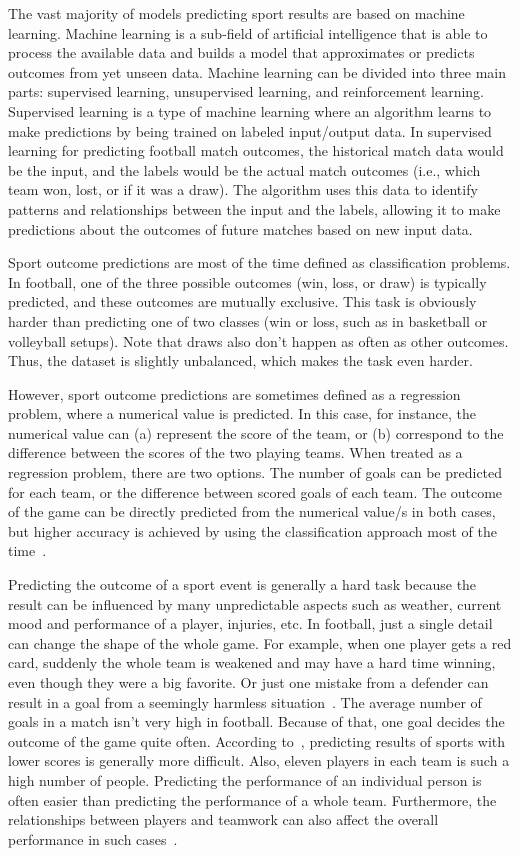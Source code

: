 \documentclass[thesis=M,english]{FITthesis}[2019/12/23]
\begin{document}
The vast majority of models predicting sport results are based on machine learning. Machine learning is a sub-field of artificial intelligence that is able to process the available data and builds a model that approximates or predicts outcomes from yet unseen data. Machine learning can be divided into three main parts: supervised learning, unsupervised learning, and reinforcement learning. Supervised learning is a type of machine learning where an algorithm learns to make predictions by being trained on labeled input/output data. In supervised learning for predicting football match outcomes, the historical match data would be the input, and the labels would be the actual match outcomes (i.e., which team won, lost, or if it was a draw). The algorithm uses this data to identify patterns and relationships between the input and the labels, allowing it to make predictions about the outcomes of future matches based on new input data. 

Sport outcome predictions are most of the time defined as classification problems. In football, one of the three possible outcomes (win, loss, or draw) is typically predicted, and these outcomes are mutually exclusive. This task is obviously harder than predicting one of two classes (win or loss, such as in basketball or volleyball setups). Note that draws also don't happen as often as other outcomes. Thus, the dataset is slightly unbalanced, which makes the task even harder. 

However, sport outcome predictions are sometimes defined as a regression problem, where a numerical value is predicted. In this case, for instance, the numerical value can (a) represent the score of the team, or (b) correspond to the difference between the scores of the two playing teams. When treated as a regression problem, there are two options. The number of goals can be predicted for each team, or the difference between scored goals of each team. The outcome of the game can be directly predicted from the numerical value/s in both cases, but higher accuracy is achieved by using the classification approach most of the time~\cite{ml_review}.

Predicting the outcome of a sport event is generally a hard task because the result can be influenced by many unpredictable aspects such as weather, current mood and performance of a player, injuries, etc. In football, just a single detail can change the shape of the whole game. For example, when one player gets a red card, suddenly the whole team is weakened and may have a hard time winning, even though they were a big favorite. Or just one mistake from a defender can result in a goal from a seemingly harmless situation~\cite{football_prediction}. The average number of goals in a match isn't very high in football. Because of that, one goal decides the outcome of the game quite often. According to~\cite{ml_review}, predicting results of sports with lower scores is generally more difficult. Also, eleven players in each team is such a high number of people. Predicting the performance of an individual person is often easier than predicting the performance of a whole team. Furthermore, the relationships between players and teamwork can also affect the overall performance in such cases~\cite{ml_review}.
\end{document}
